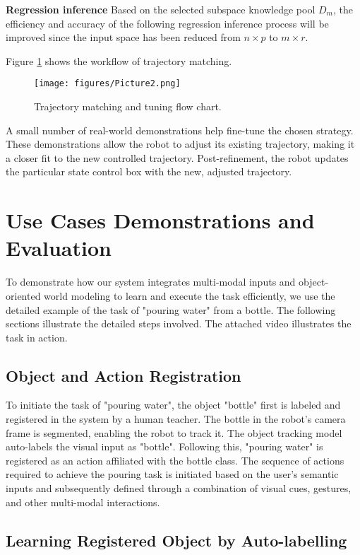 \documentclass[conference]{IEEEtran}
\begin{document}
\textbf{Regression inference} Based on the selected subspace knowledge pool $D_m$, the efficiency and accuracy of the following regression inference process will be improved since the input space has been reduced from $n\times p$ to $m\times r$.

Figure \ref{fig:trajectory} shows the workflow of trajectory matching.

\begin{figure}[!htb]
\centering
\texttt{[image: figures/Picture2.png]}
\caption{\label{fig:trajectory}Trajectory matching and tuning flow chart.}
\end{figure}

A small number of real-world demonstrations help fine-tune the chosen strategy. These demonstrations allow the robot to adjust its existing trajectory, making it a closer fit to the new controlled trajectory. Post-refinement, the robot updates the particular state control box with the new, adjusted trajectory.

\section{Use Cases Demonstrations and Evaluation}
To demonstrate how our system integrates multi-modal inputs and object-oriented world modeling to learn and execute the task efficiently, we use the detailed example of the task of "pouring water" from a bottle. The following sections illustrate the detailed steps involved. The attached video illustrates the task in action.

\subsection{Object and Action Registration}

To initiate the task of "pouring water", the object "bottle" first is labeled and registered in the system by a human teacher. The bottle in the robot's camera frame is segmented, enabling the robot to track it. The object tracking model auto-labels the visual input as "bottle". Following this, "pouring water" is registered as an action affiliated with the bottle class. The sequence of actions required to achieve the pouring task is initiated based on the user’s semantic inputs and subsequently defined through a combination of visual cues, gestures, and other multi-modal interactions.

\subsection{Learning Registered Object by Auto-labelling}
\end{document}
